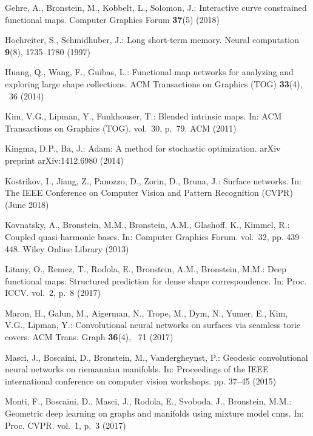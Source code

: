\documentclass[runningheads]{llncs}
\begin{document}
\begin{thebibliography}{10}
Gehre, A., Bronstein, M., Kobbelt, L., Solomon, J.: Interactive curve
  constrained functional maps. Computer Graphics Forum  \textbf{37}(5) (2018)

Hochreiter, S., Schmidhuber, J.: Long short-term memory. Neural computation
  \textbf{9}(8),  1735--1780 (1997)

Huang, Q., Wang, F., Guibas, L.: Functional map networks for analyzing and
  exploring large shape collections. ACM Transactions on Graphics (TOG)
  \textbf{33}(4), ~36 (2014)

Kim, V.G., Lipman, Y., Funkhouser, T.: Blended intrinsic maps. In: ACM
  Transactions on Graphics (TOG). vol.~30, p.~79. ACM (2011)

Kingma, D.P., Ba, J.: Adam: A method for stochastic optimization. arXiv
  preprint arXiv:1412.6980  (2014)

Kostrikov, I., Jiang, Z., Panozzo, D., Zorin, D., Bruna, J.: Surface networks.
  In: The IEEE Conference on Computer Vision and Pattern Recognition (CVPR)
  (June 2018)

Kovnatsky, A., Bronstein, M.M., Bronstein, A.M., Glashoff, K., Kimmel, R.:
  Coupled quasi-harmonic bases. In: Computer Graphics Forum. vol.~32, pp.
  439--448. Wiley Online Library (2013)

Litany, O., Remez, T., Rodola, E., Bronstein, A.M., Bronstein, M.M.: Deep
  functional maps: Structured prediction for dense shape correspondence. In:
  Proc. ICCV. vol.~2, p.~8 (2017)

Maron, H., Galun, M., Aigerman, N., Trope, M., Dym, N., Yumer, E., Kim, V.G.,
  Lipman, Y.: Convolutional neural networks on surfaces via seamless toric
  covers. ACM Trans. Graph  \textbf{36}(4), ~71 (2017)

Masci, J., Boscaini, D., Bronstein, M., Vandergheynst, P.: Geodesic
  convolutional neural networks on riemannian manifolds. In: Proceedings of the
  IEEE international conference on computer vision workshops. pp. 37--45 (2015)

Monti, F., Boscaini, D., Masci, J., Rodola, E., Svoboda, J., Bronstein, M.M.:
  Geometric deep learning on graphs and manifolds using mixture model cnns. In:
  Proc. CVPR. vol.~1, p.~3 (2017)


\end{thebibliography}
\end{document}

